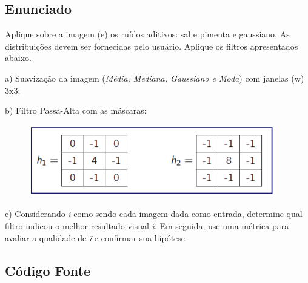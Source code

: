 \documentclass[10pt,a4paper]{article}
\begin{document}
\subsection{Enunciado}

\begin{flushleft}
Aplique sobre a imagem (e) os ruídos aditivos: sal e pimenta e gaussiano. As distribuições devem ser fornecidas pelo usuário. Aplique os filtros apresentados abaixo.
\end{flushleft}

\begin{figure}[H]
    \centering
    \qquad
    \qquad
    \qquad
    \qquad
\end{figure}

\begin{flushleft}
a) Suavização da imagem (\textit {Média, Mediana, Gaussiano e Moda}) com janelas (w) 3x3;
\end{flushleft}

\begin{flushleft}
b) Filtro Passa-Alta com as máscaras:
\end{flushleft}

\begin{figure}[H]
    \centering
    \includegraphics{images_original/08/Filtragem - matriz.png}
\end{figure}

\begin{flushleft}
c) Considerando \textit{i} como sendo cada imagem dada como entrada, determine qual filtro indicou o melhor resultado visual 
\textit{î}. Em seguida, use uma métrica para avaliar a qualidade de \textit{î} e confirmar sua hipótese
\end{flushleft}

\subsection{Código Fonte}
\end{document}
